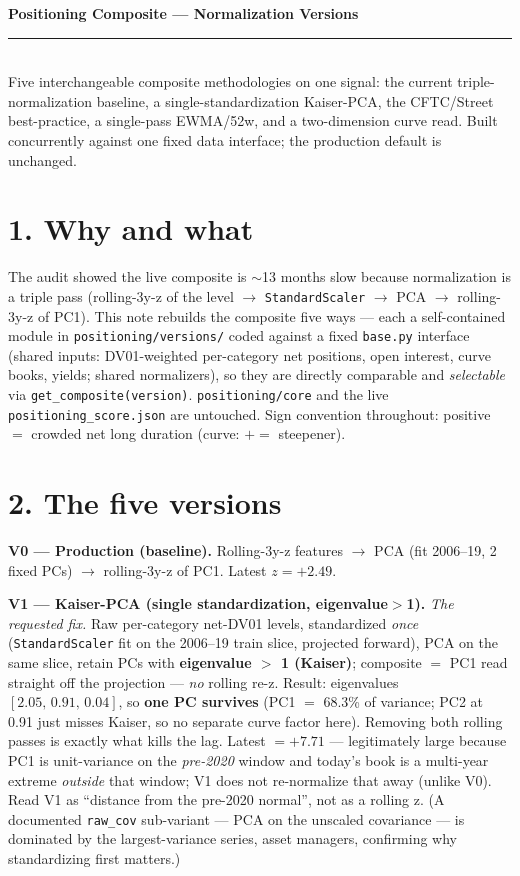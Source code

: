 \documentclass[10pt,a4paper]{article}
\newcommand{\sect}[1]{\section*{\color{bigorange}#1}}
\newcommand{\code}[1]{\texttt{\small #1}}
\begin{document}
\begin{center}
{\LARGE\textbf{\color{biggrey}Positioning Composite --- Normalization Versions}}\\[3pt]
{\color{bigorange}\rule{\textwidth}{2.5pt}}\\[3pt]
{\small Five interchangeable composite methodologies on one signal: the current triple-normalization
baseline, a single-standardization Kaiser-PCA, the CFTC/Street best-practice, a single-pass EWMA/52w, and
a two-dimension curve read. Built concurrently against one fixed data interface; the production default is
unchanged.}
\end{center}

\sect{1. Why and what}
The audit showed the live composite is $\sim$13 months slow because normalization is a triple pass
(rolling-3y-z of the level $\to$ \code{StandardScaler} $\to$ PCA $\to$ rolling-3y-z of PC1). This note
rebuilds the composite five ways --- each a self-contained module in \code{positioning/versions/} coded
against a fixed \code{base.py} interface (shared inputs: DV01-weighted per-category net positions, open
interest, curve books, yields; shared normalizers), so they are directly comparable and \emph{selectable}
via \code{get\_composite(version)}. \code{positioning/core} and the live \code{positioning\_score.json}
are untouched. Sign convention throughout: positive $=$ crowded net long duration (curve: $+ =$ steepener).

\sect{2. The five versions}
\textbf{V0 --- Production (baseline).} Rolling-3y-z features $\to$ PCA (fit 2006--19, 2 fixed PCs) $\to$
rolling-3y-z of PC1. Latest $z=+2.49$.

\textbf{V1 --- Kaiser-PCA (single standardization, eigenvalue$>$1).} \emph{The requested fix.} Raw
per-category net-DV01 levels, standardized \emph{once} (\code{StandardScaler} fit on the 2006--19 train
slice, projected forward), PCA on the same slice, retain PCs with \textbf{eigenvalue $>$ 1 (Kaiser)};
composite $=$ PC1 read straight off the projection --- \emph{no} rolling re-z. Result: eigenvalues
$[2.05,\,0.91,\,0.04]$, so \textbf{one PC survives} (PC1 $=$ 68.3\% of variance; PC2 at 0.91 just misses
Kaiser, so no separate curve factor here). Removing both rolling passes is exactly what kills the lag.
Latest $=+7.71$ --- legitimately large because PC1 is unit-variance on the \emph{pre-2020} window and
today's book is a multi-year extreme \emph{outside} that window; V1 does not re-normalize that away
(unlike V0). Read V1 as ``distance from the pre-2020 normal'', not as a rolling z. (A documented
\code{raw\_cov} sub-variant --- PCA on the unscaled covariance --- is dominated by the largest-variance
series, asset managers, confirming why standardizing first matters.)
\end{document}
